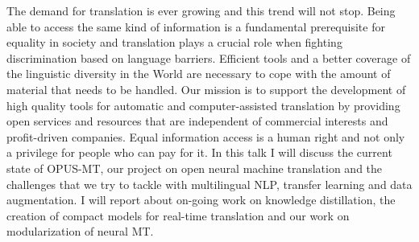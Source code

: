 The demand for translation is ever growing and this trend will not stop.
Being able to access the same kind of information is a fundamental prerequisite for equality in society and translation plays a crucial role when fighting discrimination based on language barriers.
Efficient tools and a better coverage of the linguistic diversity in the World are necessary to cope with the amount of material that needs to be handled.
Our mission is to support the development of high quality tools for automatic and computer-assisted translation by providing open services and resources that are independent of commercial interests and profit-driven companies.
Equal information access is a human right and not only a privilege for people who can pay for it.
In this talk I will discuss the current state of OPUS-MT, our project on open neural machine translation and the challenges that we try to tackle with multilingual NLP, transfer learning and data augmentation.
I will report about on-going work on knowledge distillation, the creation of compact models for real-time translation and our work on modularization of neural MT.